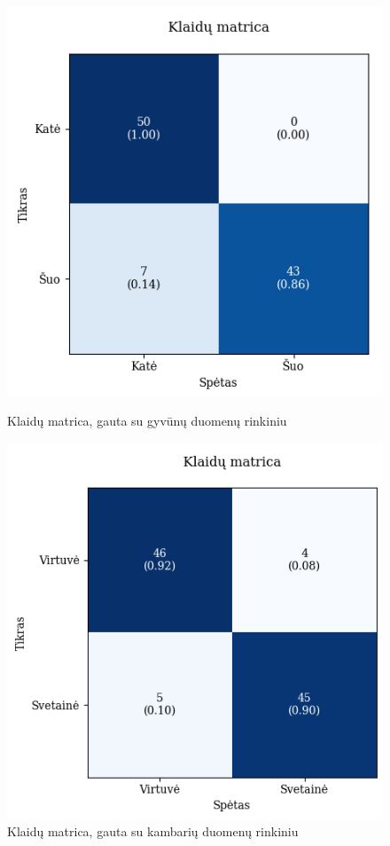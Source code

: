 \documentclass{VUMIFPSbakalaurinis}
\begin{document}
\begin{figure}[!htbp]
    \centering
    \begin{minipage}[b]{0.48\textwidth}
      \includegraphics[width=\textwidth]{img/GrapthsNEW/Large/animal/10/KM_DC_L_10.png}
      \caption{Klaidų matrica, gauta su gyvūnų duomenų rinkiniu}
    \end{minipage}
    \hspace{2mm}
    \begin{minipage}[b]{0.48\textwidth}
      \includegraphics[width=\textwidth]{img/GrapthsNEW/Large/room/10/KM_R_L_10.png}
      \caption{Klaidų matrica, gauta su kambarių duomenų rinkiniu}
    \end{minipage}
\end{figure}
\end{document}
